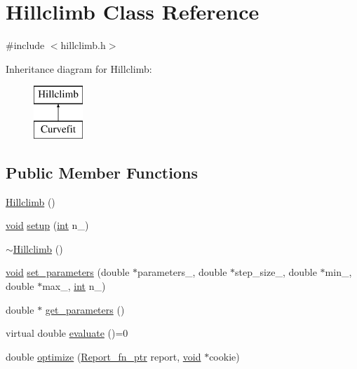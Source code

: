 \hypertarget{class_hillclimb}{}\section{Hillclimb Class Reference}
\label{class_hillclimb}


{\ttfamily \#include $<$hillclimb.\+h$>$}

Inheritance diagram for Hillclimb\+:\begin{figure}[H]
\begin{center}
\leavevmode
\includegraphics[height=2.000000cm]{class_hillclimb}
\end{center}
\end{figure}
\subsection*{Public Member Functions}
\begin{DoxyCompactItemize}
\item 
\hyperlink{class_hillclimb_a161aec964d95f4474e68ba312e79e6b5}{Hillclimb} ()
\item 
\hyperlink{sound_8c_ae35f5844602719cf66324f4de2a658b3}{void} \hyperlink{class_hillclimb_a50c1aec7038960a624c729f449c722ab}{setup} (\hyperlink{xmltok_8h_a5a0d4a5641ce434f1d23533f2b2e6653}{int} n\+\_\+)
\item 
\hyperlink{class_hillclimb_ace4a552772524a53439b9afd7cd2f286}{$\sim$\+Hillclimb} ()
\item 
\hyperlink{sound_8c_ae35f5844602719cf66324f4de2a658b3}{void} \hyperlink{class_hillclimb_ac2559b388e2eb870b051bf2985ddbb77}{set\+\_\+parameters} (double $\ast$parameters\+\_\+, double $\ast$step\+\_\+size\+\_\+, double $\ast$min\+\_\+, double $\ast$max\+\_\+, \hyperlink{xmltok_8h_a5a0d4a5641ce434f1d23533f2b2e6653}{int} n\+\_\+)
\item 
double $\ast$ \hyperlink{class_hillclimb_a70e0399ec4073f6722f772a406dd0475}{get\+\_\+parameters} ()
\item 
virtual double \hyperlink{class_hillclimb_aedb448a03580fa41f659129384341913}{evaluate} ()=0
\item 
double \hyperlink{class_hillclimb_a9f3cde5c805f98c0a4aa13163feb5305}{optimize} (\hyperlink{hillclimb_8h_aa31a227fc790865f54882e8f89dcee72}{Report\+\_\+fn\+\_\+ptr} report, \hyperlink{sound_8c_ae35f5844602719cf66324f4de2a658b3}{void} $\ast$cookie)
\end{DoxyCompactItemize}
